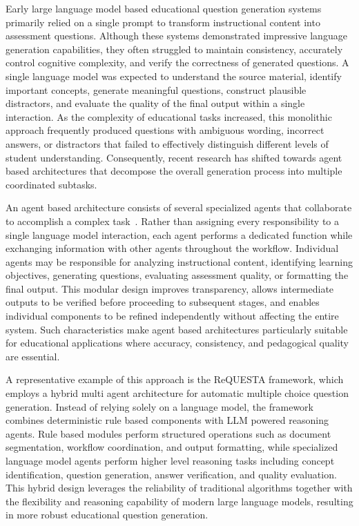 Early large language model based educational question generation systems primarily relied on a single prompt to transform instructional content into assessment questions. Although these systems demonstrated impressive language generation capabilities, they often struggled to maintain consistency, accurately control cognitive complexity, and verify the correctness of generated questions. A single language model was expected to understand the source material, identify important concepts, generate meaningful questions, construct plausible distractors, and evaluate the quality of the final output within a single interaction. As the complexity of educational tasks increased, this monolithic approach frequently produced questions with ambiguous wording, incorrect answers, or distractors that failed to effectively distinguish different levels of student understanding. Consequently, recent research has shifted towards agent based architectures that decompose the overall generation process into multiple coordinated subtasks.

An agent based architecture consists of several specialized agents that collaborate to accomplish a complex task~\cite{wu2023autogen,hong2024metagpt}. Rather than assigning every responsibility to a single language model interaction, each agent performs a dedicated function while exchanging information with other agents throughout the workflow. Individual agents may be responsible for analyzing instructional content, identifying learning objectives, generating questions, evaluating assessment quality, or formatting the final output. This modular design improves transparency, allows intermediate outputs to be verified before proceeding to subsequent stages, and enables individual components to be refined independently without affecting the entire system. Such characteristics make agent based architectures particularly suitable for educational applications where accuracy, consistency, and pedagogical quality are essential.

A representative example of this approach is the ReQUESTA framework, which employs a hybrid multi agent architecture for automatic multiple choice question generation. Instead of relying solely on a language model, the framework combines deterministic rule based components with LLM powered reasoning agents. Rule based modules perform structured operations such as document segmentation, workflow coordination, and output formatting, while specialized language model agents perform higher level reasoning tasks including concept identification, question generation, answer verification, and quality evaluation. This hybrid design leverages the reliability of traditional algorithms together with the flexibility and reasoning capability of modern large language models, resulting in more robust educational question generation.

